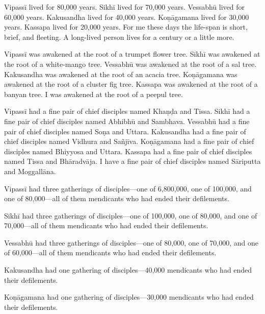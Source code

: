 \documentclass[12pt,openany]{book}%
\begin{document}
\textsanskrit{Vipassī} lived for 80,000 years. \textsanskrit{Sikhī} lived for 70,000 years. \textsanskrit{Vessabhū} lived for 60,000 years. Kakusandha lived for 40,000 years. \textsanskrit{Koṇāgamana} lived for 30,000 years. Kassapa lived for 20,000 years. For me these days the life-span is short, brief, and fleeting. A long-lived person lives for a century or a little more. 

\textsanskrit{Vipassī} was awakened at the root of a trumpet flower tree. \textsanskrit{Sikhī} was awakened at the root of a white-mango tree. \textsanskrit{Vessabhū} was awakened at the root of a sal tree. Kakusandha was awakened at the root of an acacia tree. \textsanskrit{Koṇāgamana} was awakened at the root of a cluster fig tree. Kassapa was awakened at the root of a banyan tree. I was awakened at the root of a peepul tree. 

\textsanskrit{Vipassī} had a fine pair of chief disciples named \textsanskrit{Khaṇḍa} and Tissa. \textsanskrit{Sikhī} had a fine pair of chief disciples named \textsanskrit{Abhibhū} and Sambhava. \textsanskrit{Vessabhū} had a fine pair of chief disciples named \textsanskrit{Soṇa} and Uttara. Kakusandha had a fine pair of chief disciples named Vidhura and \textsanskrit{Sañjīva}. \textsanskrit{Koṇāgamana} had a fine pair of chief disciples named Bhiyyosa and Uttara. Kassapa had a fine pair of chief disciples named Tissa and \textsanskrit{Bhāradvāja}. I have a fine pair of chief disciples named \textsanskrit{Sāriputta} and \textsanskrit{Moggallāna}. 

\textsanskrit{Vipassī} had three gatherings of disciples—one of 6,800,000, one of 100,000, and one of 80,000—all of them mendicants who had ended their defilements. 

\textsanskrit{Sikhī} had three gatherings of disciples—one of 100,000, one of 80,000, and one of 70,000—all of them mendicants who had ended their defilements. 

\textsanskrit{Vessabhū} had three gatherings of disciples—one of 80,000, one of 70,000, and one of 60,000—all of them mendicants who had ended their defilements. 

Kakusandha had one gathering of disciples—40,000 mendicants who had ended their defilements. 

\textsanskrit{Koṇāgamana} had one gathering of disciples—30,000 mendicants who had ended their defilements. 
\end{document}
